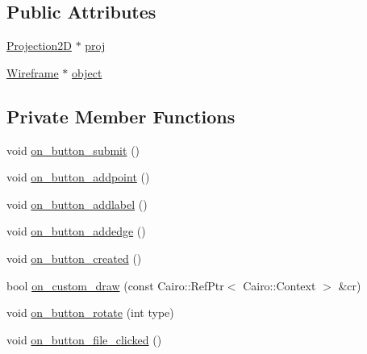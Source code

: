 \subsection*{Public Attributes}
\begin{DoxyCompactItemize}
\item 
\hyperlink{class_projection2_d}{Projection2D} $\ast$ \hyperlink{class_construct_window_a1c4f16b6dbb43569a8aa2c992b13950d}{proj}
\item 
\hyperlink{class_wireframe}{Wireframe} $\ast$ \hyperlink{class_construct_window_adc9531aab11327949db243959a44ac10}{object}
\end{DoxyCompactItemize}
\subsection*{Private Member Functions}
\begin{DoxyCompactItemize}
\item 
void \hyperlink{class_construct_window_a5dcaf37144ff4fc628256e77a9960577}{on\+\_\+button\+\_\+submit} ()
\item 
void \hyperlink{class_construct_window_a8842011425ba1b731a4dae5d967a5ffd}{on\+\_\+button\+\_\+addpoint} ()
\item 
void \hyperlink{class_construct_window_a3cb10b090a414f412670a3caf2cc6269}{on\+\_\+button\+\_\+addlabel} ()
\item 
void \hyperlink{class_construct_window_aea4ae0b05b660bbaf1bf808822d851cc}{on\+\_\+button\+\_\+addedge} ()
\item 
void \hyperlink{class_construct_window_a41da466f959938ac1f8bee034ab94b01}{on\+\_\+button\+\_\+created} ()
\item 
bool \hyperlink{class_construct_window_a207140b364fbc6412fa488fd78c11071}{on\+\_\+custom\+\_\+draw} (const Cairo\+::\+Ref\+Ptr$<$ Cairo\+::\+Context $>$ \&cr)
\item 
void \hyperlink{class_construct_window_ae4f9ac332fbef78298b93379b8b9b8df}{on\+\_\+button\+\_\+rotate} (int type)
\item 
void \hyperlink{class_construct_window_acdede928acf397bf48f9cda296df41bb}{on\+\_\+button\+\_\+file\+\_\+clicked} ()
\end{DoxyCompactItemize}
